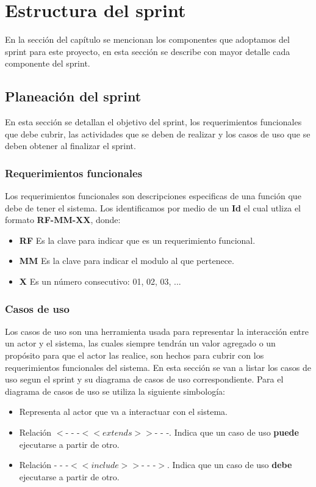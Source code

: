 
\section{Estructura del sprint}
En la sección del capítulo se mencionan los componentes que adoptamos del sprint para este proyecto, en esta sección se
describe con mayor detalle cada componente del sprint.\\

\subsection{Planeación del sprint}
En esta sección se detallan el objetivo del sprint, los requerimientos funcionales que debe cubrir, las actividades 
que se deben de realizar y los casos de uso que se deben obtener al finalizar el sprint.

\subsubsection{Requerimientos funcionales}
	Los requerimientos funcionales son descripciones especificas de una función que debe de tener el sistema. Los identificamos 
    por medio de un \textbf{Id} el cual utliza el formato \textbf{RF-MM-XX}, donde:
    \begin{itemize}
        \item \textbf{RF} Es la clave para indicar que es un requerimiento funcional.
        \item \textbf{MM} Es la clave para indicar el modulo al que pertenece.
        \item \textbf{X} Es un número consecutivo: 01, 02, 03, ...
    \end{itemize}

\subsubsection{Casos de uso}
    Los casos de uso son una herramienta usada para representar la interacción entre un actor y el sistema, las cuales siempre 
    tendrán un valor agregado o un propósito para que el actor las realice, son hechos para cubrir con los requerimientos 
    funcionales del sistema.
    En esta sección se van a listar los casos de uso segun el sprint y su diagrama de casos de uso correspondiente.
    Para el diagrama de casos de uso se utiliza la siguiente simbología:
    \begin{itemize}
        \UCpaso Representa al sistema mediante un óvalo.
       \item \UCactor Representa al actor que va a interactuar con el sistema.
       \item Relación $<$- - -$<<extends>>$- - -. Indica que un caso de uso \textbf{puede} ejecutarse a partir de otro.
       \item Relación - - -$<<include>>$- - -$>$. Indica que un caso de uso \textbf{debe} ejecutarse a partir de otro.
   \end{itemize}

